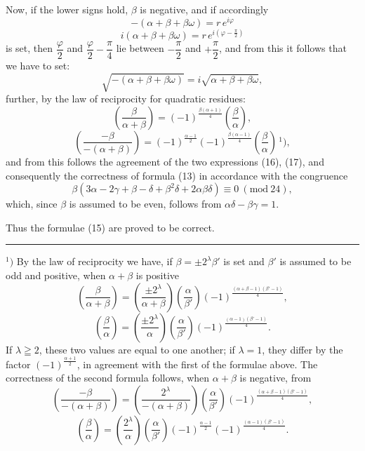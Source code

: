 Now, if the lower signs hold, $\beta$ is negative, and if accordingly
\[
-(\alpha+\beta+\beta\omega) = r\,e^{i\varphi}
\]
\[
i(\alpha+\beta+\beta\omega) = r\,e^{i\left(\varphi-\frac{\pi}{2}\right)}
\]
is set, then $\dfrac{\varphi}{2}$ and $\dfrac{\varphi}{2}-\dfrac{\pi}{4}$ lie between $-\dfrac{\pi}{2}$
and $+\dfrac{\pi}{2}$, and from this it follows that we have to set:
\[
\sqrt{-(\alpha+\beta+\beta\omega)} = i\sqrt{\alpha+\beta+\beta\omega},
\]
further, by the law of reciprocity for quadratic residues:
\[
\left(\frac{\beta}{\alpha+\beta}\right) = (-1)^{\frac{\beta(\alpha+1)}{4}}\left(\frac{\beta}{\alpha}\right),
\]
\[
\left(\frac{-\beta}{-(\alpha+\beta)}\right) = (-1)^{\frac{\alpha-1}{2}}(-1)^{\frac{\beta(\alpha-1)}{4}}\left(\frac{\beta}{\alpha}\right)\,^{1}),
\]
and from this follows the agreement of the two expressions
(16), (17), and consequently the correctness of formula (13) in accordance
with the congruence
\[
\beta(3\alpha-2\gamma+\beta-\delta+\beta^2\delta+2\alpha\beta\delta) \equiv 0\ (\mathrm{mod}\ 24),
\]
which, since $\beta$ is assumed to be even, follows from $\alpha\delta-\beta\gamma=1$.

Thus the formulae (15) are proved to be correct.

\noindent\rule{4cm}{0.4pt}

\noindent $^{1})$ By the law of reciprocity we have, if $\beta=\pm2^\lambda\beta'$ is set and $\beta'$
is assumed to be odd and positive, when $\alpha+\beta$ is positive
\[
\left(\frac{\beta}{\alpha+\beta}\right) = \left(\frac{\pm2^\lambda}{\alpha+\beta}\right)\left(\frac{\alpha}{\beta'}\right)
(-1)^{\frac{(\alpha+\beta-1)(\beta'-1)}{4}},
\]
\[
\left(\frac{\beta}{\alpha}\right) = \left(\frac{\pm2^\lambda}{\alpha}\right)\left(\frac{\alpha}{\beta'}\right)
(-1)^{\frac{(\alpha-1)(\beta'-1)}{4}}.
\]
If $\lambda\geqq2$, these two values are equal to one another; if $\lambda=1$, they
differ by the factor $(-1)^{\frac{\alpha+1}{2}}$, in agreement
with the first of the formulae above. The correctness of the second formula
follows, when $\alpha+\beta$ is negative, from
\[
\left(\frac{-\beta}{-(\alpha+\beta)}\right) = \left(\frac{2^\lambda}{-(\alpha+\beta)}\right)\left(\frac{\alpha}{\beta'}\right)
(-1)^{\frac{(\alpha+\beta-1)(\beta'-1)}{4}},
\]
\[
\left(\frac{\beta}{\alpha}\right) = \left(\frac{2^\lambda}{\alpha}\right)\left(\frac{\alpha}{\beta'}\right)(-1)^{\frac{\alpha-1}{2}}
(-1)^{\frac{(\alpha-1)(\beta'-1)}{4}}.
\]
